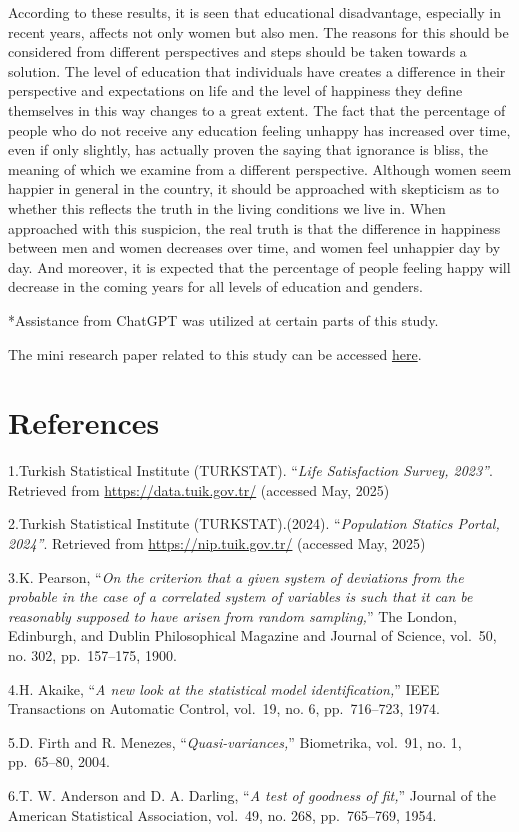 \documentclass[
  11pt,
  a4paper,
  DIV=11,
  numbers=noendperiod]{scrartcl}
\begin{document}
According to these results, it is seen that educational disadvantage,
especially in recent years, affects not only women but also men. The
reasons for this should be considered from different perspectives and
steps should be taken towards a solution. The level of education that
individuals have creates a difference in their perspective and
expectations on life and the level of happiness they define themselves
in this way changes to a great extent. The fact that the percentage of
people who do not receive any education feeling unhappy has increased
over time, even if only slightly, has actually proven the saying that
ignorance is bliss, the meaning of which we examine from a different
perspective. Although women seem happier in general in the country, it
should be approached with skepticism as to whether this reflects the
truth in the living conditions we live in. When approached with this
suspicion, the real truth is that the difference in happiness between
men and women decreases over time, and women feel unhappier day by day.
And moreover, it is expected that the percentage of people feeling happy
will decrease in the coming years for all levels of education and
genders.

*Assistance from ChatGPT was utilized at certain parts of this study.

The mini research paper related to this study can be accessed
\href{assets/documents/Paper.pdf}{here}.

\section{References}\label{references}

1.Turkish Statistical Institute (TURKSTAT). ``\emph{Life Satisfaction
Survey, 2023''}. Retrieved from \url{https://data.tuik.gov.tr/}
(accessed May, 2025)

2.Turkish Statistical Institute (TURKSTAT).(2024). ``\emph{Population
Statics Portal, 2024''}. Retrieved from \url{https://nip.tuik.gov.tr/}
(accessed May, 2025)

3.K. Pearson, ``\emph{On the criterion that a given system of deviations
from the probable in the case of a correlated system of variables is
such that it can be reasonably supposed to have arisen from random
sampling,}'' The London, Edinburgh, and Dublin Philosophical Magazine
and Journal of Science, vol.~50, no. 302, pp.~157--175, 1900.

4.H. Akaike, ``\emph{A new look at the statistical model
identification,}'' IEEE Transactions on Automatic Control, vol.~19, no.
6, pp.~716--723, 1974.

5.D. Firth and R. Menezes, ``\emph{Quasi-variances,}'' Biometrika,
vol.~91, no. 1, pp.~65--80, 2004.

6.T. W. Anderson and D. A. Darling, ``\emph{A test of goodness of
fit,}'' Journal of the American Statistical Association, vol.~49, no.
268, pp.~765--769, 1954.
\end{document}
